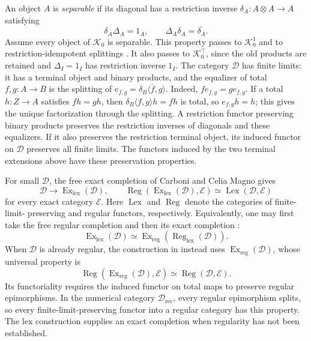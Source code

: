 \documentclass[11pt]{article}
\theoremstyle{definition}
\theoremstyle{remark}
\begin{document}
An object $A$ is \emph{separable} if its diagonal has a
restriction inverse $\delta_A:A\otimes A\to A$ satisfying
\[
 \delta_A\Delta_A=1_A,\qquad
 \Delta_A\delta_A=\overline{\delta_A}.
\]
Assume every object of $\mathcal K_0$ is separable. This property
passes to $\mathcal K_0^1$ and to restriction-idempotent splittings
\cite[Section~4]{RecursionCompletions}. It also passes to
$\mathcal K_0^\top$, since the old products are retained and
$\Delta_I=1_I$ has restriction inverse $1_I$.
The category $\mathcal D$
has finite limits: it has a terminal object and binary products,
and the equalizer of total $f,g:A\to B$ is the splitting of
$e_{f,g}=\overline{\delta_B\langle f,g\rangle}$.
Indeed, $fe_{f,g}=ge_{f,g}$. If a total $h:Z\to A$ satisfies
$fh=gh$, then
$\delta_B\langle f,g\rangle h=fh$ is total, so
$e_{f,g}h=h$; this gives the unique factorization through the
splitting. A restriction functor preserving binary products
preserves the restriction inverses of diagonals and these
equalizers. If it also preserves the restriction terminal object,
its induced functor on $\mathcal D$ preserves all finite limits.
The functors induced by the two terminal extensions above have
these preservation properties.

For small $\mathcal D$, the free exact completion of
Carboni and Celia Magno \cite{CarboniCeliaMagno1982} gives
\[
 \mathcal D\longrightarrow\operatorname{Ex}_{\mathrm{lex}}
 (\mathcal D),\qquad
 \operatorname{Reg}(\operatorname{Ex}_{\mathrm{lex}}(\mathcal D),
                    \mathcal E)
 \simeq \operatorname{Lex}(\mathcal D,\mathcal E)
\]
for every exact category $\mathcal E$. Here $\operatorname{Lex}$
and $\operatorname{Reg}$ denote the categories of finite-limit-
preserving and regular functors, respectively. Equivalently, one
may first take the free regular completion and then its exact
completion \cite{CarboniVitale}:
\[
 \operatorname{Ex}_{\mathrm{lex}}(\mathcal D)
 \simeq
 \operatorname{Ex}_{\mathrm{reg}}
       (\operatorname{Reg}_{\mathrm{lex}}(\mathcal D)).
\]
When $\mathcal D$ is already regular, the construction in
\cite[Section~6]{RecursionCompletions} instead uses
$\operatorname{Ex}_{\mathrm{reg}}(\mathcal D)$, whose universal
property is
\[
 \operatorname{Reg}(\operatorname{Ex}_{\mathrm{reg}}(\mathcal D),
                    \mathcal E)
 \simeq \operatorname{Reg}(\mathcal D,\mathcal E).
\]
Its functoriality requires the induced functor on total maps to
preserve regular epimorphisms. In the numerical category
$\mathcal D_{\mathrm{rec}}$, every regular epimorphism splits,
so every finite-limit-preserving functor into a regular category
has this property. The $\mathrm{lex}$ construction supplies an
exact completion when regularity has not been established.
\end{document}
